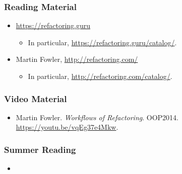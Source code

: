 \begin{frame}

\frametitle{Reading Material}

\footnotesize

\begin{itemize}

\item \url{https://refactoring.guru}

\begin{itemize}

\item In particular, \url{https://refactoring.guru/catalog/}.

\end{itemize}

\item Martin Fowler, \url{http://refactoring.com/}

\begin{itemize}

\item In particular, \url{http://refactoring.com/catalog/}.

\end{itemize}

\end{itemize}

\end{frame}


\begin{frame}

\frametitle{Video Material}

\footnotesize

\begin{itemize}

\item Martin Fowler. \emph{Workflows of Refactoring}. OOP2014.
\url{https://youtu.be/vqEg37e4Mkw}.

\end{itemize}

\end{frame}


\begin{frame}

\frametitle{Summer Reading}

\footnotesize

\begin{itemize}

\item

\end{itemize}

\end{frame}
